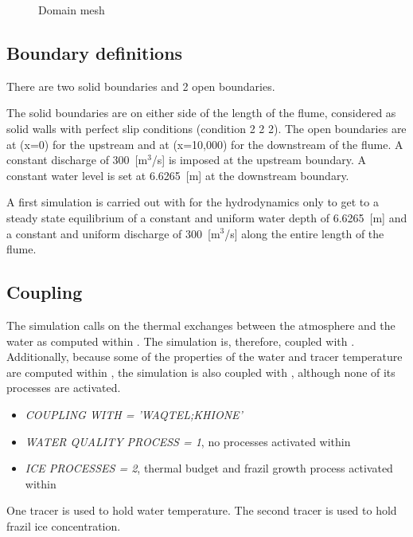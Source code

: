 \begin{figure}[H]
    \begin{center}
    \end{center}
    \caption{Domain mesh}
    \label{fig:growth_mesh}
\end{figure}

\subsection{Boundary definitions}
There are two solid boundaries and 2 open boundaries.\newline

The solid boundaries are on either side of the length of the flume, considered as solid walls with perfect slip conditions (condition 2 2 2).
The open boundaries are at (x=0) for the upstream and at (x=10,000) for the downstream of the flume. A constant discharge of 300~[m$^3$/s] is imposed at the upstream boundary. A constant water level is set at 6.6265~[m] at the downstream boundary.\newline

A first simulation is carried out with for the hydrodynamics only to get to a steady state equilibrium of a constant and uniform water depth of 6.6265~[m] and a constant and uniform discharge of 300~[m$^3$/s] along the entire length of the flume.

\subsection{Coupling}
The simulation calls on the thermal exchanges between the atmosphere and the water as computed within \khione. The simulation is, therefore, coupled with \khione. Additionally, because some of the properties of the water and tracer temperature are computed within \waqtel, the simulation is also coupled with \waqtel, although none of its processes are activated.
\begin{itemize}
    \item\textit{COUPLING WITH = 'WAQTEL;KHIONE'}
    \item\textit{WATER QUALITY PROCESS = 1}, no processes activated within \waqtel
    \item\textit{ICE PROCESSES = 2}, thermal budget and frazil growth process activated within \khione
\end{itemize}
One tracer is used to hold water temperature. The second tracer is used to hold frazil ice concentration.


